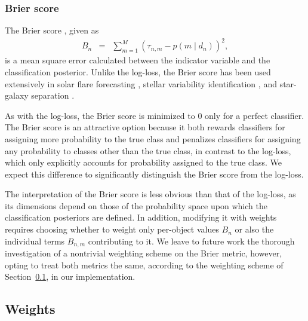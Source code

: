 \subsubsection{Brier score}
\label{sec:brier}

The Brier score \citep{brier_verification_1950}, given as
\begin{eqnarray}
  \label{eq:brier}
  B_{n} &=& \sum_{m=1}^{M} (\tau_{n, m} - p(m \mid d_{n}))^{2},
\end{eqnarray}
is a mean square error calculated between the indicator variable and the classification posterior.
Unlike the log-loss, the Brier score has been used extensively in solar flare forecasting \citep{crown_validation_2012, mays_ensemble_2015, florios_forecasting_2018}, stellar variability identification \citep{richards_construction_2012, armstrong_k2_2016}, and star-galaxy separation \citep{kim_hybrid_2015}.

As with the log-loss, the Brier score is minimized to $0$ only for a perfect classifier.
The Brier score is an attractive option because it both rewards classifiers for  assigning more probability to the true class and penalizes classifiers for assigning any probability to classes other than the true class, in contrast to the log-loss, which only explicitly accounts for probability assigned to the true class.
We expect this difference to significantly distinguish the Brier score from the log-loss.

The interpretation of the Brier score is less obvious than that of the log-loss, as its dimensions depend on those of the probability space upon which the classification posteriors are defined.
In addition, modifying it with weights requires choosing whether to weight only per-object values $B_{n}$ or also the individual terms $B_{n, m}$ contributing to it.
We leave to future work the thorough investigation of a nontrivial weighting scheme on the Brier metric, however, opting to treat both metrics the same, according to the weighting scheme of Section~\ref{sec:weights}, in our implementation.

\subsection{Weights}
\label{sec:weights}

